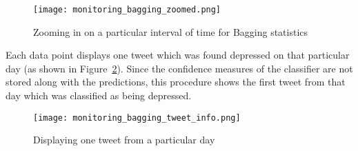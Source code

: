 \begin{figure}
    \centering
    \texttt{[image: monitoring\_bagging\_zoomed.png]}
    \caption{Zooming in on a particular interval of time for Bagging statistics}
    \label{fig:monitoring_bagging_zoomed}
\end{figure}

Each data point displays one tweet which was found depressed on that particular day (as shown in Figure~\ref{fig:monitoring_bagging_tweet_info}). Since the confidence measures of the classifier are not stored along with the predictions, this procedure shows the first tweet from that day which was classified as being depressed.

\begin{figure}
    \centering
    \texttt{[image: monitoring\_bagging\_tweet\_info.png]}
    \caption{Displaying one tweet from a particular day}
    \label{fig:monitoring_bagging_tweet_info}
\end{figure}
